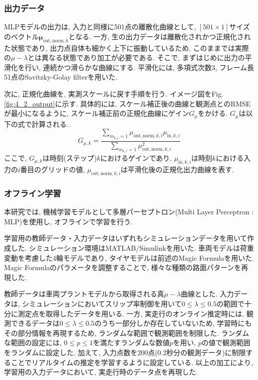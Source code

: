 \documentclass[11pt,a4paper,oneside,onecolumn,fleqn,dvipdfmx]{jsarticle}
\begin{document}
\subsubsection{出力データ}
MLPモデルの出力は, 入力と同様に501点の離散化曲線として, $[501\times1]$サイズのベクトル$\bm{\mu}_{\mathrm{out,norm},k}$となる. 
一方, 生の出力データは離散化されかつ正規化された状態であり, 出力点自体も細かく上下に振動しているため, このままでは実際の$\mu-\lambda$とは異なる状態であり加工が必要である. 
そこで, まずはじめに出力の平滑化を行い, 連続かつ滑らかな曲線にする. 平滑化には, 多項式次数3, フレーム長51点のSavitzky-Golay filterを用いた. 

次に, 正規化曲線を, 実測スケールに戻す手順を行う. イメージ図をFig.\ref{fig:4_2_output}に示す.
具体的には, スケール補正後の曲線と観測点とのRMSEが最小になるように, スケール補正前の正規化曲線にゲイン$G_\mu$をかける. 
$G_\mu$は以下の式で計算される.
\begin{equation}
    G_{\mu,k}
    =
    \frac{
    \displaystyle \sum_{m_{k,i}=1}
    \mu_{\mathrm{out,norm},{k,i}}\mu_{\mathrm{in},{k,i}}
    }{
    \displaystyle \sum_{m_{k,i}=1}
    \mu_{\mathrm{out,norm},{k,i}}^{2}
    }
\end{equation}
ここで, $G_{\mu,k}$は時刻(ステップ)$k$におけるゲインであり, $\mu_{\mathrm{in},{k,i}}$は時刻$k$における入力の$i$番目のグリッドの値, $\mu_{\mathrm{out,norm},{k,i}}$は平滑化後の正規化出力曲線を表す. 

\subsubsection{オフライン学習}
本研究では, 機械学習モデルとして多層パーセプトロン(Multi Layer Perceptron : MLP)を使用し, オフラインで学習を行う. 

学習用の教師データ・入力データはいずれもシミュレーションデータを用いて作成した. シミュレーション環境はMATLAB/Simulinkを用いた. 車両モデルは荷重変動を考慮した4輪モデルであり, タイヤモデルは前述のMagic Formulaを用いた. 
Magic Formulaのパラメータを調整することで, 様々な種類の路面パターンを再現した. 

教師データは車両プラントモデルから取得される真$\mu-\lambda$曲線とした. 
入力データは, シミュレーションにおいてスリップ率制御を用いて$0\le \lambda \le 0.5$の範囲で十分に測定点を取得したデータを用いる. 
一方, 実走行のオンライン推定時には, 観測できるデータは$0\le \lambda \le 0.5$のうち一部分しか存在していないため, 学習時にもその部分情報を再現するため, ランダムな範囲で観測範囲を制限した. 
ランダムな範囲の設定には, $0 \le  p \le 1$を満たすランダムな数値$p$を用い, $p$の値で観測範囲をランダムに設定した.
加えて, 入力点数を200点(0.2秒分の観測データ)に制限することでリアルタイムの推定を学習するように設定している. 
以上の加工により, 学習用の入力データにおいて, 実走行時のデータ点を再現した. 
\end{document}
